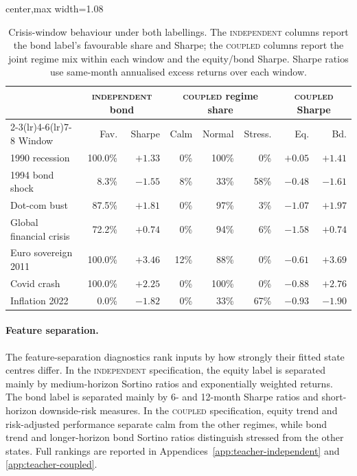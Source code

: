 \documentclass[10pt]{article}
\newcommand{\Acoup}{\textsc{coupled}}
\newcommand{\Bindep}{\textsc{independent}}
\begin{document}
\begin{table}[H]
\centering
\caption{Crisis-window behaviour under both labellings. The \Bindep{} columns report the bond
label's favourable share and Sharpe; the \Acoup{} columns report the joint regime mix within
each window and the equity/bond Sharpe. Sharpe ratios use same-month annualised excess
returns over each window.}
\label{tab:crisis}
\small
\begin{adjustbox}{center,max width=1.08\textwidth}
\begin{tabular}{lrrrrrrr}
\toprule
& \multicolumn{2}{c}{\Bindep{} bond} & \multicolumn{3}{c}{\Acoup{} regime share} & \multicolumn{2}{c}{\Acoup{} Sharpe} \\
\cmidrule(lr){2-3}\cmidrule(lr){4-6}\cmidrule(lr){7-8}
Window & Fav. & Sharpe & Calm & Normal & Stress. & Eq. & Bd. \\
\midrule
1990 recession          & 100.0\% & $+1.33$ & 0\%  & 100\% & \phantom{0}0\%  & $+0.05$ & $+1.41$ \\
1994 bond shock         & \phantom{0}8.3\% & $-1.55$ & 8\%  & 33\%  & 58\% & $-0.48$ & $-1.61$ \\
Dot-com bust            & 87.5\% & $+1.81$ & 0\%  & 97\%  & \phantom{0}3\%  & $-1.07$ & $+1.97$ \\
Global financial crisis & 72.2\% & $+0.74$ & 0\%  & 94\%  & \phantom{0}6\%  & $-1.58$ & $+0.74$ \\
Euro sovereign 2011     & 100.0\% & $+3.46$ & 12\% & 88\%  & \phantom{0}0\%  & $-0.61$ & $+3.69$ \\
Covid crash             & 100.0\% & $+2.25$ & 0\%  & 100\% & \phantom{0}0\%  & $-0.88$ & $+2.76$ \\
Inflation 2022          & \phantom{0}0.0\% & $-1.82$ & 0\%  & 33\%  & 67\% & $-0.93$ & $-1.90$ \\
\bottomrule
\end{tabular}
\end{adjustbox}
\end{table}

\paragraph{Feature separation.}
The feature-separation diagnostics rank inputs by how strongly their fitted state centres
differ. In the \Bindep{} specification, the equity label is separated mainly by
medium-horizon Sortino ratios and exponentially weighted returns. The bond label is separated
mainly by 6- and 12-month Sharpe ratios and short-horizon downside-risk measures. In the
\Acoup{} specification, equity trend and risk-adjusted performance separate calm from the
other regimes, while bond trend and longer-horizon bond Sortino ratios distinguish stressed
from the other states. Full rankings are reported in Appendices~\ref{app:teacher-independent}
and \ref{app:teacher-coupled}.
\end{document}
